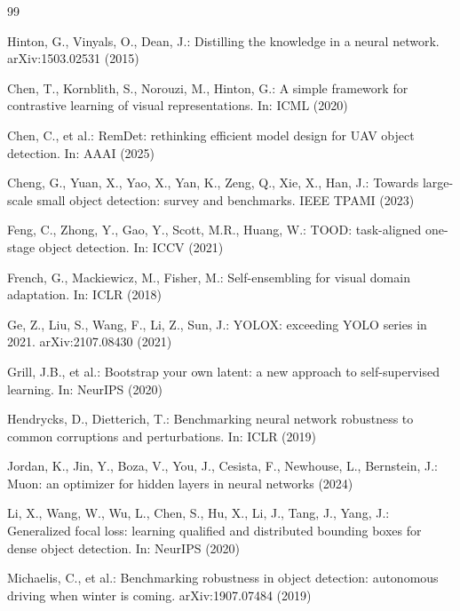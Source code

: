 \begin{thebibliography}{99}

Hinton, G., Vinyals, O., Dean, J.: Distilling the knowledge in a neural
network. arXiv:1503.02531 (2015)

Chen, T., Kornblith, S., Norouzi, M., Hinton, G.: A simple framework for
contrastive learning of visual representations. In: ICML (2020)

Chen, C., et al.: RemDet: rethinking efficient model design for UAV object
detection. In: AAAI (2025)

Cheng, G., Yuan, X., Yao, X., Yan, K., Zeng, Q., Xie, X., Han, J.: Towards
large-scale small object detection: survey and benchmarks. IEEE TPAMI (2023)

Feng, C., Zhong, Y., Gao, Y., Scott, M.R., Huang, W.: TOOD: task-aligned
one-stage object detection. In: ICCV (2021)

French, G., Mackiewicz, M., Fisher, M.: Self-ensembling for visual domain
adaptation. In: ICLR (2018)

Ge, Z., Liu, S., Wang, F., Li, Z., Sun, J.: YOLOX: exceeding YOLO series in
2021. arXiv:2107.08430 (2021)

Grill, J.B., et al.: Bootstrap your own latent: a new approach to
self-supervised learning. In: NeurIPS (2020)

Hendrycks, D., Dietterich, T.: Benchmarking neural network robustness to
common corruptions and perturbations. In: ICLR (2019)

Jordan, K., Jin, Y., Boza, V., You, J., Cesista, F., Newhouse, L.,
Bernstein, J.: Muon: an optimizer for hidden layers in neural networks
(2024)

Li, X., Wang, W., Wu, L., Chen, S., Hu, X., Li, J., Tang, J., Yang, J.:
Generalized focal loss: learning qualified and distributed bounding boxes
for dense object detection. In: NeurIPS (2020)

Michaelis, C., et al.: Benchmarking robustness in object detection:
autonomous driving when winter is coming. arXiv:1907.07484 (2019)


\end{thebibliography}
